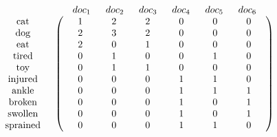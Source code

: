 \documentclass[
]{article}
\theoremstyle{definition}
\theoremstyle{definition}
\theoremstyle{definition}
\theoremstyle{definition}
\theoremstyle{remark}
\begin{document}
\begin{equation*}
    \begin{array}{cc}
         & \begin{array}{cccccc} \;doc_1\; & \;doc_2\;& \;doc_3\;& \;doc_4\;& \;doc_5\;& \;doc_6\; \end{array}\\
          \begin{array}{c}
            \hbox{cat} \\
            \hbox{dog}\\
            \hbox{eat}\\
            \hbox{tired} \\
            \hbox{toy}\\
            \hbox{injured} \\
            \hbox{ankle} \\
            \hbox{broken} \\
            \hbox{swollen} \\
            \hbox{sprained} \\
        \end{array} &
\left(
\begin{array}{cccccc}
\quad 1\quad   &  \quad 2\quad   &  \quad 2\quad   &  \quad 0\quad   &  \quad 0\quad   &  \quad 0\quad  \\
\quad 2\quad   &  \quad 3\quad   &  \quad 2\quad   &  \quad 0\quad   &  \quad 0\quad   &  \quad 0\quad  \\
\quad 2\quad   &  \quad 0\quad   &  \quad 1\quad   &  \quad 0\quad   &  \quad 0\quad   &  \quad 0\quad  \\
\quad 0\quad   &  \quad 1\quad   &  \quad 0\quad   &  \quad 0\quad   &  \quad 1\quad   &  \quad 0\quad  \\
\quad 0\quad   &  \quad 1\quad   &  \quad 1\quad   &  \quad 0\quad   &  \quad 0\quad   &  \quad 0\quad  \\
\quad 0\quad   &  \quad 0\quad   &  \quad 0\quad   &  \quad 1\quad   &  \quad 1\quad   &  \quad 0\quad  \\
\quad 0\quad   &  \quad 0\quad   &  \quad 0\quad   &  \quad 1\quad   &  \quad 1\quad   &  \quad 1\quad  \\
\quad 0\quad   &  \quad 0\quad   &  \quad 0\quad   &  \quad 1\quad   &  \quad 0\quad   &  \quad 1\quad  \\
\quad 0\quad   &  \quad 0\quad   &  \quad 0\quad   &  \quad 1\quad   &  \quad 0\quad   &  \quad 1\quad  \\
\quad 0\quad   &  \quad 0\quad   &  \quad 0\quad   &  \quad 1\quad   &  \quad 1\quad   &  \quad 0\quad  \\
\end{array}\right)
\end{array}
\end{equation*}
\end{document}
